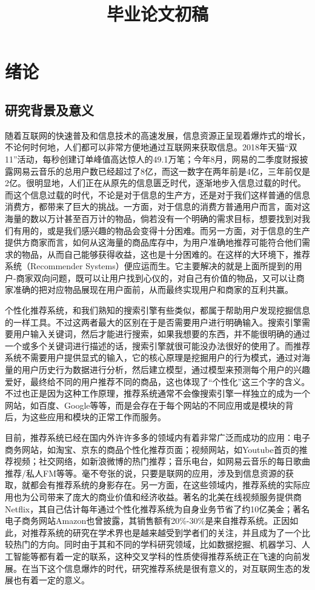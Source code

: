 \documentclass{article}
\title{毕业论文初稿}
\begin{document}
\maketitle
\tableofcontents
\section{绪论}
	\subsection{研究背景及意义}
	随着互联网的快速普及和信息技术的高速发展，信息资源正呈现着爆炸式的增长，不论何时何地，人们都可以非常方便地通过互联网来获取信息。2018年天猫“双11”活动，每秒创建订单峰值高达惊人的49.1万笔；今年8月，网易的二季度财报披露网易云音乐的总用户数已经超过了8亿，而这一数字在两年前是4亿，三年前仅是2亿。很明显地，人们正在从原先的信息匮乏时代，逐渐地步入信息过载的时代。而这个信息过载的时代，不论是对于信息的生产方，还是对于我们这样普通的信息消费方，都带来了巨大的挑战。一方面，对于信息的消费方普通用户而言，面对这海量的数以万计甚至百万计的物品，倘若没有一个明确的需求目标，想要找到对我们有用的，或是我们感兴趣的物品会变得十分困难。而另一方面，对于信息的生产提供方商家而言，如何从这海量的商品库存中，为用户准确地推荐可能符合他们需求的物品，从而自己能够获得收益，这也是十分困难的。在这样的大环境下，推荐系统（Recommender Systems）便应运而生。它主要解决的就是上面所提到的用户-商家双向问题，既可以让用户找到心仪的，对自己有价值的物品，又可以让商家准确的把对应物品展现在用户面前，从而最终实现用户和商家的互利共赢。

	个性化推荐系统，和我们熟知的搜索引擎有些类似，都属于帮助用户发现挖掘信息的一样工具。不过这两者最大的区别在于是否需要用户进行明确输入。搜索引擎需要用户输入关键词，然后才能进行搜索，如果我想要的东西，并不能很明确的通过一个或多个关键词进行描述的话，搜索引擎就很可能没办法很好的使用了。而推荐系统不需要用户提供显式的输入，它的核心原理是挖掘用户的行为模式，通过对海量的用户历史行为数据进行分析，然后建立模型，通过模型来预测每个用户的兴趣爱好，最终给不同的用户推荐不同的商品，这也体现了“个性化”这三个字的含义。不过也正是因为这种工作原理，推荐系统通常不会像搜索引擎一样独立的成为一个网站，如百度、Google等等，而是会存在于每个网站的不同应用或是模块的背后，为这些应用和模块的正常工作而服务。

	目前，推荐系统已经在国内外许许多多的领域内有着非常广泛而成功的应用：电子商务网站，如淘宝、京东的商品个性化推荐页面；视频网站，如Youtube首页的推荐视频；社交网络，如新浪微博的热门推荐；音乐电台，如网易云音乐的每日歌曲推荐/私人FM等等。毫不夸张的说，只要是联网的应用，涉及到信息资源的获取，就都会有推荐系统的身影存在。另一方面，在这些领域内，推荐系统的实际应用也为公司带来了庞大的商业价值和经济收益。著名的北美在线视频服务提供商Netflix，其自己估计每年通过个性化推荐系统为自身业务节省了约10亿美金；著名电子商务网站Amazon也曾披露，其销售额有20\%-30\%是来自推荐系统。正因如此，对推荐系统的研究在学术界也是越来越受到学者们的关注，并且成为了一个比较热门的方向。同时由于其和不同的学科研究领域，比如数据挖掘、机器学习、人工智能等都有着一定的联系，这种交叉学科的性质使得推荐系统正在飞速的向前发展。在当下这个信息爆炸的时代，研究推荐系统是很有意义的，对互联网生态的发展也有着一定的意义。
\end{document}
